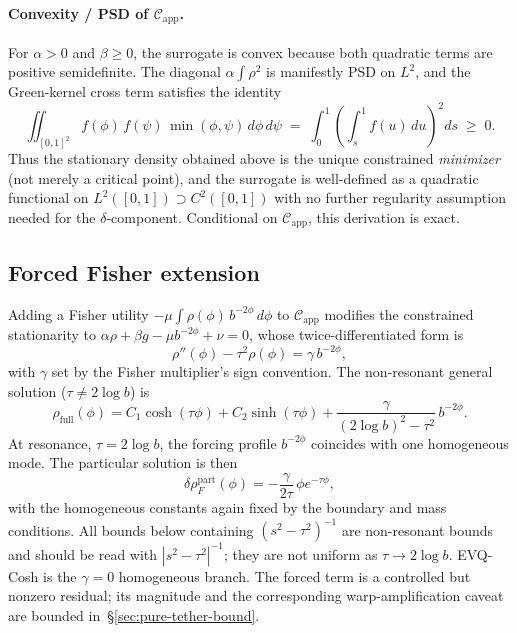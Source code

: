 \paragraph{Convexity / PSD of $\mathcal{C}_{\mathrm{app}}$.} For $\alpha{>}0$ and $\beta{\geq}0$, the surrogate is convex because both quadratic terms are positive semidefinite. The diagonal $\alpha{\int}\rho^2$ is manifestly PSD on $L^2$, and the Green-kernel cross term satisfies the identity
\begin{equation}
\iint_{[0,1]^2} f(\phi)\,f(\psi)\,\min(\phi,\psi)\,d\phi\,d\psi \;=\; \int_0^1 \!\left(\int_s^1 f(u)\,du\right)^{\!2}\!ds \;\geq\; 0.
\label{eq:min-kernel-psd}
\end{equation}
Thus the stationary density obtained above is the unique constrained \emph{minimizer} (not merely a critical point), and the surrogate is well-defined as a quadratic functional on $L^2([0,1])\supset C^2([0,1])$ with no further regularity assumption needed for the $\delta$-component. Conditional on $\mathcal{C}_{\mathrm{app}}$, this derivation is exact.

\subsection{Forced Fisher extension}
\label{subsec:fisher-ext}

Adding a Fisher utility $-\mu\!\int\rho(\phi)\,b^{-2\phi}\,d\phi$ to $\mathcal{C}_{\mathrm{app}}$ modifies the constrained stationarity to $\alpha\rho+\beta g -\mu b^{-2\phi}+\nu = 0$, whose twice-differentiated form is
\begin{equation}
\rho''(\phi) - \tau^2\rho(\phi) = \gamma\,b^{-2\phi},
\label{eq:forced-ode}
\end{equation}
with $\gamma$ set by the Fisher multiplier's sign convention. The non-resonant general solution ($\tau\neq 2\log b$) is
\begin{equation}
\rho_{\mathrm{full}}(\phi)
=
C_1\cosh(\tau\phi)+C_2\sinh(\tau\phi)+\frac{\gamma}{(2\log b)^2-\tau^2}\,b^{-2\phi}.
\end{equation}
At resonance, $\tau=2\log b$, the forcing profile $b^{-2\phi}$ coincides with one homogeneous mode. The particular solution is then
\begin{equation}
\delta\rho_F^{\mathrm{part}}(\phi)
= -\frac{\gamma}{2\tau}\,\phi e^{-\tau\phi},
\end{equation}
with the homogeneous constants again fixed by the boundary and mass conditions. All bounds below containing $(s^2-\tau^2)^{-1}$ are non-resonant bounds and should be read with $|s^2-\tau^2|^{-1}$; they are not uniform as $\tau\to 2\log b$.
EVQ-Cosh is the $\gamma{=}0$ homogeneous branch. The forced term is a controlled but nonzero residual; its magnitude and the corresponding warp-amplification caveat are bounded in~\S\ref{sec:pure-tether-bound}.

